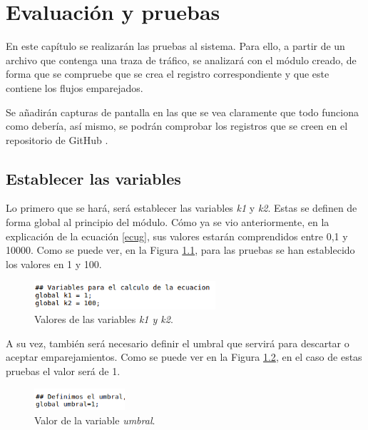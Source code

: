 \chapter{Evaluación y pruebas}\label{evaluacion}

En este capítulo se realizarán las pruebas al sistema. Para ello, a partir de un archivo que contenga una traza de tráfico, se 
analizará con el módulo creado, de forma que se compruebe que se crea el registro correspondiente y que este contiene los flujos 
emparejados.

\intro Se añadirán capturas de pantalla en las que se vea claramente que todo funciona como debería, así mismo, se podrán comprobar 
los registros que se creen en el repositorio de GitHub \citep{repo}.

\section{Establecer las variables}

Lo primero que se hará, será establecer las variables \textit{k1} y \textit{k2}. Estas se definen de forma global al principio 
del módulo. Cómo ya se vio anteriormente, en la explicación de la ecuación \ref{ecug}, sus valores estarán comprendidos entre 0,1 y 
10000. Como se puede ver, en la Figura \ref{fig.variables}, para las pruebas se han establecido los valores en 1 y 100.

\begin{figure}[H]
  \includegraphics[width=0.6\textwidth]{imagenes/variables.png}
  \centering
  \caption{Valores de las variables \textit{k1 y k2}.}\label{fig.variables}
\end{figure}

\intro A su vez, también será necesario definir el umbral que servirá para descartar o aceptar emparejamientos. Como se puede ver en 
la Figura \ref{fig.definirumbral}, en el caso de estas pruebas el valor será de 1.

\begin{figure}[H]
  \includegraphics[width=0.3\textwidth]{imagenes/definirumbral.png}
  \centering
  \caption{Valor de la variable \textit{umbral}.}\label{fig.definirumbral}
\end{figure}


